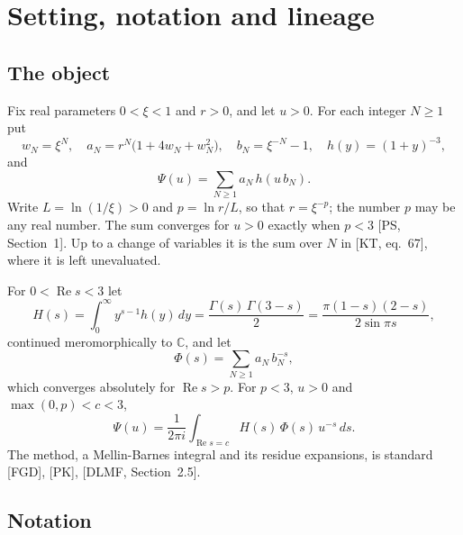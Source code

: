 \documentclass[11pt]{article}
\newcommand{\re}{\operatorname{Re}}
\begin{document}
\section{Setting, notation and lineage}\label{sec:setting}

\subsection{The object}

Fix real parameters $0<\xi<1$ and $r>0$, and let $u>0$. For each integer $N\ge1$ put
\[
w_N=\xi^N,\quad a_N=r^N\bigl(1+4w_N+w_N^2\bigr),\quad b_N=\xi^{-N}-1,\quad h(y)=(1+y)^{-3},
\]
and
\[
\Psi(u)=\sum_{N\ge1}a_N\,h(u\,b_N).
\]
Write $L=\ln(1/\xi)>0$ and $p=\ln r/L$, so that $r=\xi^{-p}$; the number $p$ may be any real number. The sum converges for $u>0$ exactly when $p<3$ [PS, Section~1]. Up to a change of variables it is the sum over $N$ in [KT, eq.~67], where it is left unevaluated.

For $0<\re s<3$ let
\[
H(s)=\int_0^\infty y^{s-1}h(y)\,dy=\frac{\Gamma(s)\,\Gamma(3-s)}{2}=\frac{\pi(1-s)(2-s)}{2\sin\pi s},
\]
continued meromorphically to $\mathbb{C}$, and let
\[
\Phi(s)=\sum_{N\ge1}a_N\,b_N^{-s},
\]
which converges absolutely for $\re s>p$. For $p<3$, $u>0$ and $\max(0,p)<c<3$,
\begin{equation*}
\Psi(u)=\frac{1}{2\pi i}\int_{\re s=c}H(s)\,\Phi(s)\,u^{-s}\,ds. \tag{MB}
\end{equation*}
The method, a Mellin-Barnes integral and its residue expansions, is standard [FGD], [PK], [DLMF, Section~2.5].

\subsection{Notation}\label{sec:notation}
\end{document}
